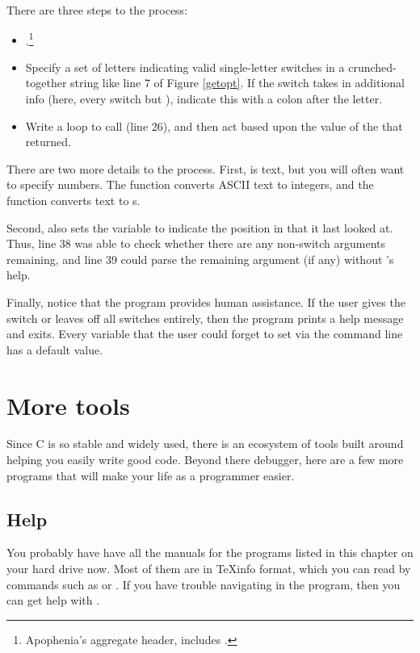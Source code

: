 There are three steps to the process:
\begin{itemize}
\item {}.\footnote{Apophenia's aggregate header,
 includes .}
\item Specify a set of letters indicating valid single-letter switches in a crunched-together string like line 7 of Figure \ref{getopt}. If the switch
takes in additional info (here, every switch but ), indicate this with a colon after the letter. 
\item Write a  loop to call  (line 26), and then
act based upon the value of the  that  returned.
\end{itemize}

There are two more details to the process. First,  is text, but
you will often want to specify numbers. The function 
converts ASCII text to integers, and the function
 converts text to s. 

Second,  also sets the variable  to indicate the
position in  that it last looked at. Thus, line 38 was able to
check whether there are any non-switch arguments remaining, and line 39
could parse the remaining argument (if any) without 's help.

Finally, notice that the program provides human assistance. If the user
gives the  switch or leaves off all switches entirely, then the
program prints a help message and exits. Every variable that the
user could forget to set via the command line has a default value.

\section{More tools} 
Since C is so stable and widely used, there is an ecosystem of tools built around
helping you easily write good code.  Beyond there debugger, here are a
few more programs that will make your life as a programmer easier.

\subsection{Help} 
You probably have have all the manuals for the programs listed in this
chapter on your hard drive now. Most of them are in \TeX info format,
which you can read by commands such as  or . If
you have trouble navigating in the  program, then you can
get help with .

